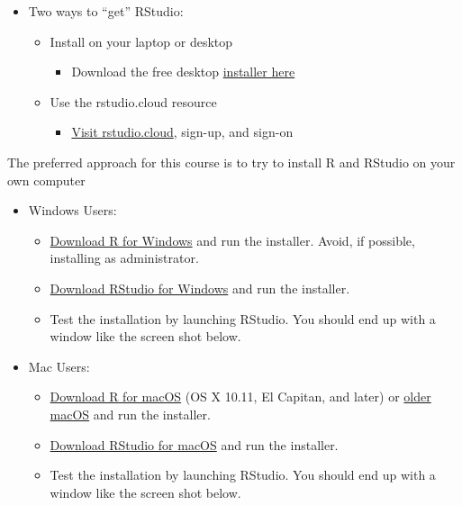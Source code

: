 \documentclass[]{book}
\providecommand{\tightlist}{%
  \setlength{\itemsep}{0pt}\setlength{\parskip}{0pt}}
\begin{document}
\begin{itemize}
\tightlist
\item
  Two ways to ``get'' RStudio:

  \begin{itemize}
  \tightlist
  \item
    Install on your laptop or desktop

    \begin{itemize}
    \tightlist
    \item
      Download the free desktop \href{https://rstudio.com/products/rstudio/download/\#download}{installer here}
    \end{itemize}
  \item
    Use the rstudio.cloud resource

    \begin{itemize}
    \tightlist
    \item
      \href{https://rstudio.cloud/}{Visit rstudio.cloud}, sign-up, and sign-on
    \end{itemize}
  \end{itemize}
\end{itemize}

The preferred approach for this course is to try to install R and RStudio on your own computer

\begin{itemize}
\tightlist
\item
  Windows Users:

  \begin{itemize}
  \tightlist
  \item
    \href{https://cran.rstudio.com/bin/windows/base/R-3.6.3-win.exe}{Download R for Windows} and run the installer. Avoid, if possible, installing as administrator.
  \item
    \href{https://download1.rstudio.org/desktop/windows/RStudio-1.2.5033.exe}{Download RStudio for Windows} and run the installer.
  \item
    Test the installation by launching RStudio. You should end up with a window like the screen shot below.
  \end{itemize}
\item
  Mac Users:

  \begin{itemize}
  \tightlist
  \item
    \href{https://cran.rstudio.com/bin/macosx/R-3.6.3.pkg}{Download R for macOS} (OS X 10.11, El Capitan, and later) or \href{https://cran.rstudio.com/bin/macosx/R-3.6.3.nn.pkg}{older macOS} and run the installer.
  \item
    \href{https://download1.rstudio.org/desktop/macos/RStudio-1.2.5033.dmg}{Download RStudio for macOS} and run the installer.
  \item
    Test the installation by launching RStudio. You should end up with a window like the screen shot below.
  \end{itemize}
\end{itemize}
\end{document}
